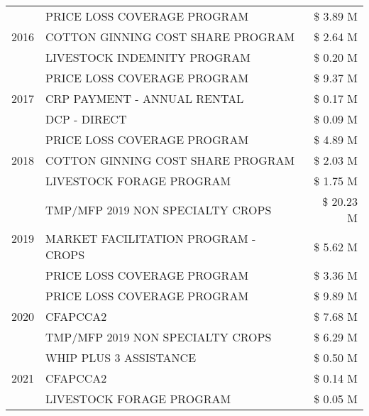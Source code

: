 \begin{tabular}{llr}
\cline{1-3}
\multirow[t]{3}{*}{2016} & PRICE LOSS COVERAGE PROGRAM & \$ 3.89 M \\
 & COTTON GINNING COST SHARE PROGRAM & \$ 2.64 M \\
 & LIVESTOCK INDEMNITY PROGRAM & \$ 0.20 M \\
\cline{1-3}
\multirow[t]{3}{*}{2017} & PRICE LOSS COVERAGE PROGRAM & \$ 9.37 M \\
 & CRP PAYMENT - ANNUAL RENTAL & \$ 0.17 M \\
 & DCP - DIRECT & \$ 0.09 M \\
\cline{1-3}
\multirow[t]{3}{*}{2018} & PRICE LOSS COVERAGE PROGRAM & \$ 4.89 M \\
 & COTTON GINNING COST SHARE PROGRAM & \$ 2.03 M \\
 & LIVESTOCK FORAGE PROGRAM & \$ 1.75 M \\
\cline{1-3}
\multirow[t]{3}{*}{2019} & TMP/MFP 2019 NON SPECIALTY CROPS & \$ 20.23 M \\
 & MARKET FACILITATION PROGRAM - CROPS & \$ 5.62 M \\
 & PRICE LOSS COVERAGE PROGRAM & \$ 3.36 M \\
\cline{1-3}
\multirow[t]{3}{*}{2020} & PRICE LOSS COVERAGE PROGRAM & \$ 9.89 M \\
 & CFAPCCA2 & \$ 7.68 M \\
 & TMP/MFP 2019 NON SPECIALTY CROPS & \$ 6.29 M \\
\cline{1-3}
\multirow[t]{3}{*}{2021} & WHIP PLUS 3 ASSISTANCE & \$ 0.50 M \\
 & CFAPCCA2 & \$ 0.14 M \\
 & LIVESTOCK FORAGE PROGRAM & \$ 0.05 M \\
\cline{1-3}
\bottomrule
\end{tabular}

